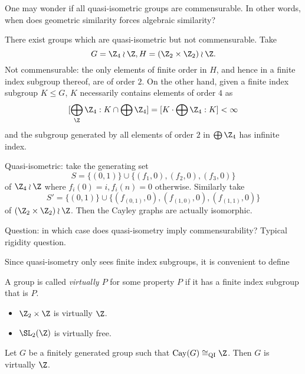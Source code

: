 \documentclass[a4paper]{article}
\DeclareMathOperator{\Cay}{Cay} %
\begin{document}
One may wonder if all quasi-isometric groups are commensurable. In other words, when does geometric similarity forces algebraic similarity? 

\begin{eg}
  There exist groups which are quasi-isometric but not commensurable. Take
  \[
    G = \Z_4 \wr \Z, H = (\Z_2 \times \Z_2) \wr \Z.
  \]
  Not commensurable: the only elements of finite order in \(H\), and hence in a finite index subgroup thereof, are of order \(2\). On the other hand, given a finite index subgroup \(K \leq G\), \(K\) necessarily contains elements of order \(4\) as
  \[
    [\bigoplus_\Z \Z_4: K \cap \bigoplus \Z_4] = [K \cdot \bigoplus \Z_4: K] < \infty
  \]
  and the subgroup generated by all elements of order \(2\) in \(\bigoplus \Z_4\) has infinite index.

  Quasi-isometric: take the generating set
  \[
    S = \{(0, 1)\} \cup \{(f_1, 0), (f_2, 0), (f_3, 0)\}
  \]
  of \(\Z_4 \wr \Z\) where \(f_i(0) = i, f_i(n) = 0\) otherwise. Similarly take
  \[
    S' = \{(0, 1)\} \cup \{(f_{(0, 1)}, 0), (f_{(1, 0)}, 0), (f_{(1, 1)}, 0)\}
  \]
  of \((\Z_2 \times \Z_2) \wr \Z\). Then the Cayley graphs are actually isomorphic.
\end{eg}

Question: in which case does quasi-isometry imply commensurability? Typical rigidity question.

Since quasi-isometry only sees finite index subgroups, it is convenient to define

\begin{definition}
  A group is called \emph{virtually \(P\)} for some property \(P\) if it has a finite index subgroup that is \(P\).
\end{definition}

\begin{eg}\leavevmode
  \begin{itemize}
  \item \(\Z_2 \times \Z\) is virtually \(\Z\).
  \item \(\SL_2(\Z)\) is virtually free.
  \end{itemize}
\end{eg}

\begin{theorem}
  Let \(G\) be a finitely generated group such that \(\Cay(G) \cong_{\mathrm{QI}} \Z\). Then \(G\) is virtually \(\Z\).
\end{theorem}
\end{document}
